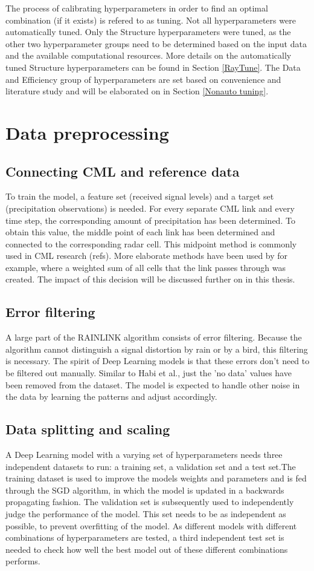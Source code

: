 \documentclass[twocolumn, 10pt, a4paper]{memoir}
\begin{document}
	The process of calibrating hyperparameters in order to find an optimal combination (if it exists) is refered to as tuning. Not all hyperparameters were automatically tuned. Only the Structure hyperparameters were tuned, as the other two hyperparameter groups need to be determined based on the input data and the available computational resources. More details on the automatically tuned Structure hyperparameters can be found in Section \ref{RayTune}. The Data and Efficiency group of hyperparameters are set based on convenience and literature study and will be elaborated on in Section \ref{Nonauto tuning}.
	
	
	\section{Data preprocessing} \label{datapreprocess}
	\subsection{Connecting CML and reference data}
	To train the model, a feature set (received signal levels) and a target set (precipitation observations) is needed. For every separate CML link and every time step, the corresponding amount of precipitation has been determined. To obtain this value, the middle point of each link has been determined and connected to the corresponding radar cell. This midpoint method is commonly used in CML research (refs). More elaborate methods have been used by  for example, where a weighted sum of all cells that the link passes through was created. The impact of this decision will be discussed further on in this thesis.
	\subsection{Error filtering}
	A large part of the RAINLINK algorithm consists of error filtering. Because the algorithm cannot distinguish a signal distortion by rain or by a bird, this filtering is necessary. The spirit of Deep Learning models is that these errors don't need to be filtered out manually. Similar to Habi et al., just the 'no data' values have been removed from the dataset. The model is expected to handle other noise in the data by learning the patterns and adjust accordingly.
	\subsection{Data splitting and scaling}
	A Deep Learning model with a varying set of hyperparameters needs three independent datasets to run: a training set, a validation set and a test set.The training dataset is used to improve the models weights and parameters and is fed through the SGD algorithm, in which the model is updated in a backwards propagating fashion. The validation set is subsequently used to independently judge the performance of the model. This set needs to be as independent as possible, to prevent overfitting of the model.
	As different models with different combinations of hyperparameters are tested, a third independent test set is needed to check how well the best model out of these different combinations performs.  
	
\end{document}
